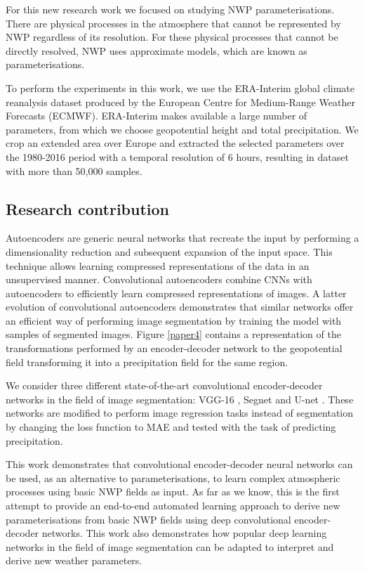 \medskip

For this new research work we focused on studying NWP parameterisations. There are physical processes in the atmosphere that cannot be represented by NWP regardless of its resolution. For these physical processes that cannot be directly resolved, NWP uses approximate models, which are known as parameterisations.

\medskip

To perform the experiments in this work, we use the ERA-Interim global climate reanalysis dataset produced by the European Centre for Medium-Range Weather Forecasts (ECMWF). ERA-Interim makes available a large number of parameters, from which we choose geopotential height and total precipitation. We crop an extended area over Europe and extracted the selected parameters over the 1980-2016 period with a temporal resolution of 6 hours, resulting in dataset with more than 50,000 samples. 


\subsection{Research contribution}

Autoencoders \citep{hinton2006reducing} are generic neural networks that recreate the input by performing a dimensionality reduction and subsequent expansion of the input space. This technique allows learning compressed representations of the data in an unsupervised manner. Convolutional autoencoders combine CNNs with autoencoders to efficiently learn compressed representations of images. A latter evolution of convolutional autoencoders demonstrates that similar networks offer an efficient way of performing image segmentation by training the model with samples of segmented images. Figure \ref{paper4} contains a representation of the transformations performed by an encoder-decoder network to the geopotential field transforming it into a precipitation field for the same region.

\medskip

We consider three different state-of-the-art convolutional encoder-decoder networks in the field of image segmentation: VGG-16 \citep{long2015fully}, Segnet \citep{badrinarayanan2017segnet} and U-net \citep{ronneberger2015u}. These networks are modified to perform image regression tasks instead of segmentation by changing the loss function to MAE and tested with the task of predicting precipitation.

\medskip

This work demonstrates that convolutional encoder-decoder neural networks can be used, as an alternative to parameterisations, to learn complex atmospheric processes using basic NWP fields as input. As far as we know, this is the first attempt to provide an end-to-end automated learning approach to derive new parameterisations from basic NWP fields using deep convolutional encoder-decoder networks. This work also demonstrates how popular deep learning networks in the field of image segmentation can be adapted to interpret and derive new weather parameters.

